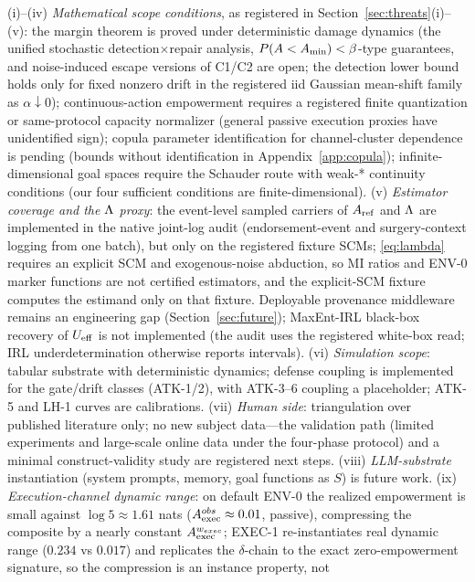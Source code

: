 (i)--(iv) \emph{Mathematical scope conditions}, as registered in
Section~\ref{sec:threats}(i)--(v): the margin theorem is proved under
deterministic damage dynamics (the unified stochastic detection$\times$repair
analysis, $P(A<A_{\min})<\beta$-type guarantees, and noise-induced escape versions
of C1/C2 are open; the detection lower bound holds only for fixed nonzero
drift in the registered iid Gaussian mean-shift family as
$\alpha\downarrow0$); continuous-action empowerment requires a registered
finite quantization or same-protocol capacity normalizer (general passive
execution proxies have unidentified sign); copula parameter identification
for channel-cluster dependence is pending (bounds without identification in
Appendix~\ref{app:copula}); infinite-dimensional goal spaces require the
Schauder route with weak-* continuity conditions (our four sufficient
conditions are finite-dimensional). (v) \emph{Estimator coverage and the $\Lambda$ proxy}: the
event-level sampled carriers of $A_{\mathrm{ref}}$ and $\Lambda$ are implemented in the
native joint-log audit (endorsement-event and surgery-context logging from one
batch), but only on the registered fixture SCMs; \eqref{eq:lambda} requires an
explicit SCM and exogenous-noise abduction, so MI ratios and ENV-0 marker
functions are not certified estimators, and the explicit-SCM fixture computes
the estimand only on that fixture. Deployable provenance middleware remains an
engineering gap (Section~\ref{sec:future}); MaxEnt-IRL black-box recovery of
$U_{\mathrm{eff}}$ is not implemented (the audit uses the registered white-box read; IRL
underdetermination otherwise reports intervals). (vi) \emph{Simulation scope}: tabular substrate
with deterministic dynamics; defense coupling is implemented for the
gate/drift classes (ATK-1/2), with ATK-3--6 coupling a placeholder; ATK-5
and LH-1 curves are calibrations. (vii) \emph{Human side}: triangulation
over published literature only; no new subject data---the validation path
(limited experiments and large-scale online data under the four-phase
protocol) and a minimal construct-validity study are registered next steps.
(viii) \emph{LLM-substrate} instantiation (system prompts, memory, goal
functions as $S$) is future work. (ix) \emph{Execution-channel dynamic range}: on
default ENV-0 the realized empowerment is small against $\log 5\approx1.61$
nats ($A_{\mathrm{exec}}^{obs}\approx0.01$, passive), compressing the composite by a
nearly constant $A_{\mathrm{exec}}^{w_{exec}}$; EXEC-1 re-instantiates real dynamic range
($0.234$ vs $0.017$) and replicates the $\delta$-chain to the exact
zero-empowerment signature, so the compression is an instance property, not
